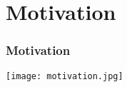 
\section{Motivation}

\begin{frame}
\frametitle{Motivation}
\begin{center}
\texttt{[image: motivation.jpg]}
\end{center}
\end{frame}
